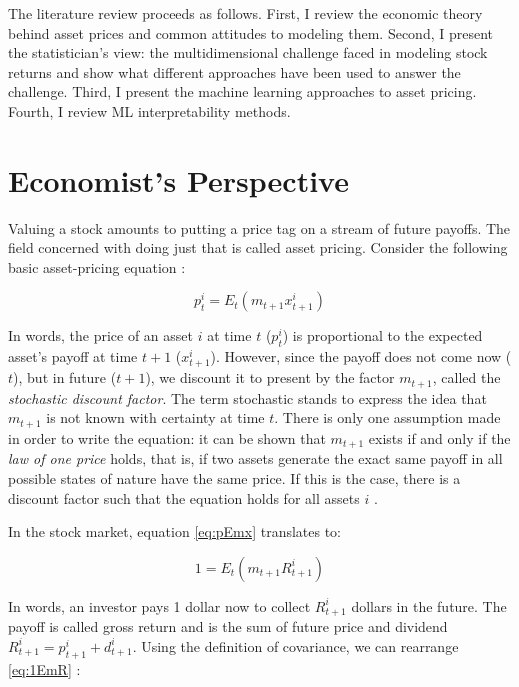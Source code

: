  	The literature review proceeds as follows. First, I review the economic theory behind asset prices and common attitudes to modeling them. Second, I present the statistician's view: the multidimensional challenge faced in modeling stock returns \citep{cochrane2011presidential} and show what different approaches have been used to answer the challenge. Third, I present the machine learning approaches to asset pricing. Fourth, I review ML interpretability methods. 
 	
 	\section{Economist's Perspective}
 	
	 	Valuing a stock amounts to putting a price tag on a stream of future payoffs. The field concerned with doing just that is called asset pricing. Consider the following basic asset-pricing equation \citep{cochrane2009asset}:
	 	
	 	\begin{equation}
	 		p_t^i = E_t(m_{t+1} x_{t+1}^i ) \label{eq:pEmx}
	 	\end{equation}
	 	
	 	In words, the price of an asset $i$ at time $t$ ($p_t^i$) is proportional to the expected asset's payoff at time $t+1$ ($x_{t+1}^i$). However, since the payoff does not come now ($t$), but in future ($t+1$), we discount it to present by the factor $m_{t+1}$, called the \textit{stochastic discount factor}. The term stochastic stands to express the idea that $m_{t+1}$ is not known with certainty at time $t$. There is only one assumption made in order to write the equation: it can be shown that $m_{t+1}$ exists if and only if the \textit{law of one price} holds, that is, if two assets generate the exact same payoff in all possible states of nature have the same price. If this is the case, there is a discount factor such that the equation holds for all assets $i$ \citep{cochrane2009asset}.
	 	
	 	In the stock market, equation \ref{eq:pEmx} translates to:
	 	
	 	\begin{equation}
	 		1 = E_t(m_{t+1} R_{t+1}^i ) \label{eq:1EmR}
	 	\end{equation} 
	 	
	 	In words, an investor pays 1 dollar now to collect $R_{t+1}^i$ dollars in the future. The payoff is called gross return and is the sum of future price and dividend $R_{t+1}^i = p_{t+1}^i+ d_{t+1}^i$. 
	 	Using the definition of covariance, we can rearrange \ref{eq:1EmR} \citep{cochrane2009asset}:
	 	

